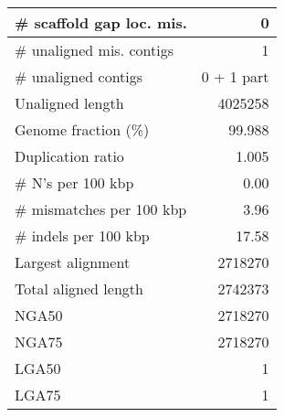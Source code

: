 \documentclass[12pt,a4paper]{article}
\begin{document}
\begin{table}[ht]
\begin{center}
\begin{tabular}{|l*{1}{|r}|}
\# scaffold gap loc. mis. & 0 \\ \hline
\# unaligned mis. contigs & 1 \\ \hline
\# unaligned contigs & 0 + 1 part \\ \hline
Unaligned length & 4025258 \\ \hline
Genome fraction (\%) & 99.988 \\ \hline
Duplication ratio & 1.005 \\ \hline
\# N's per 100 kbp & 0.00 \\ \hline
\# mismatches per 100 kbp & 3.96 \\ \hline
\# indels per 100 kbp & 17.58 \\ \hline
Largest alignment & 2718270 \\ \hline
Total aligned length & 2742373 \\ \hline
NGA50 & 2718270 \\ \hline
NGA75 & 2718270 \\ \hline
LGA50 & 1 \\ \hline
LGA75 & 1 \\ \hline
\end{tabular}
\end{center}
\end{table}
\end{document}
